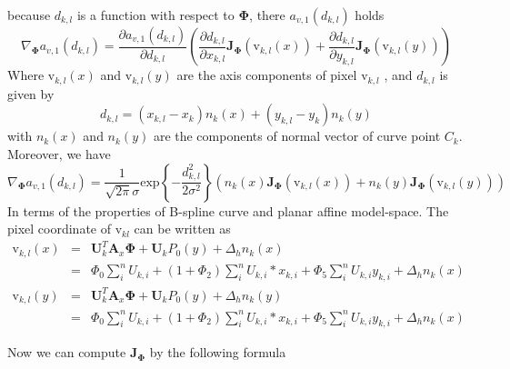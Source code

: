 because $d_{k,l}$ is a function with respect to $\mathbf{\Phi}$, there
$a_{v,1}(d_{k,l})$ holds
\begin{equation}
  \label{eq:5.26}
\nabla_{\mathbf{\Phi}} a_{v,1}(d_{k,l}) = \frac{\partial a_{v,1}(d_{k,l})}{\partial d_{k,l}}
\left( \frac{\partial d_{k,l}}{\partial x_{k,l}}\mathbf{J}_{\mathbf{\Phi}}(\mathrm{v}_{k,l}(x)) + \frac{\partial d_{k,l}}{\partial y_{k,l}}\mathbf{J}_{\mathbf{\Phi}}(\mathrm{v}_{k,l}(y))
 \right)  
\end{equation}
Where $\mathrm{v}_{k,l}(x)$ and $\mathrm{v}_{k,l}(y)$ are the axis
components of pixel $\mathrm{v}_{k,l}$ , and $d_{k,l}$ is given by
\begin{equation}
  \label{eq:5.27}
  d_{k,l} = (x_{k,l} - x_{k})n_{k}(x) +(y_{k,l} - y_{k}) n_{k}(y)
\end{equation}
with $n_{k}(x)$ and $n_{k}(y)$ are the components of normal vector of
curve point $C_{k}$. Moreover, we have
\begin{equation}
  \label{eq:5.28}
  \nabla_{\mathbf{\Phi}} a_{v,1}(d_{k,l}) = \frac{1}{\sqrt{2\pi}\sigma} \mathrm{exp}\left\{ -\frac{d_{k,l}^2}{2\sigma^2} \right\}
\left( n_k(x)\mathbf{J}_{\mathbf{\Phi}}(\mathrm{v}_{k,l}(x)) + n_k(y)\mathbf{J}_{\mathbf{\Phi}}(\mathrm{v}_{k,l}(y))
 \right) 
\end{equation}
In terms of the properties of  B-spline curve  and planar affine
model-space. The pixel coordinate of $\mathrm{v}_{kl}$ can be written
as
\begin{eqnarray}
  \label{eq:5.29}
\mathrm{v}_{k,l}(x) &= & \mathbf{U}_k^{T}\mathbf{A}_x \mathbf{\Phi} + \mathbf{U}_k P_0(y) + \Delta_h n_k(x) \\
          &=&\Phi_0\sum_{i}^nU_{k,i} +
          (1+\Phi_2)\sum_{i}^nU_{k,i}*x_{k,i} + \Phi_{5}\sum_{i}^n
          U_{k,i}y_{k,i} + \Delta_h n_k(x)\\
\mathrm{v}_{k,l}(y) &=& \mathbf{U}_k^{T}\mathbf{A}_x \mathbf{\Phi} +
\mathbf{U}_k P_0(y) + \Delta_h n_k(y) \\
          &=&\Phi_0\sum_{i}^nU_{k,i} +
          (1+\Phi_2)\sum_{i}^nU_{k,i}*x_{k,i} + \Phi_{5}\sum_{i}^n
          U_{k,i}y_{k,i} + \Delta_h n_k(x)
\end{eqnarray}

Now we can compute $\mathbf{J}_{\mathbf{\Phi}}$ by the following
formula

